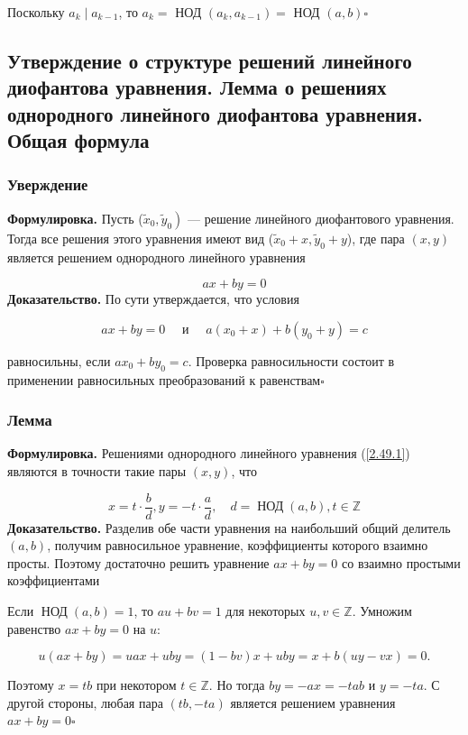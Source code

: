 \documentclass[a4paper]{article}
\newcommand{\qed}{\hfill$\square$}
\begin{document}
Поскольку $a_{k} \mid a_{k-1}$, то $a_{k}=$ НОД $\left(a_{k}, a_{k-1}\right)=$ НОД $(a, b)$\qed

\subsection{Утверждение о структуре решений линейного диофантова уравнения. Лемма о решениях однородного линейного диофантова уравнения. Общая формула}
\subsubsection*{Уверждение}
\textbf{Формулировка.} Пусть ($\left.\tilde{x}_{0}, \tilde{y}_{0}\right)$ — решение линейного диофантового уравнения. Тогда все решения этого уравнения имеют вид ($\tilde{x}_{0}+x, \tilde{y}_{0}+y$), где пара $(x, y)$ является решением однородного линейного уравнения

\begin{equation*}
a x+b y=0 \tag{2.49.1}\label{2.49.1}
\end{equation*}
\indent\textbf{Доказательство.} По сути утверждается, что условия

$$
a x+b y=0 \quad \text { и } \quad a\left(x_{0}+x\right)+b\left(y_{0}+y\right)=c
$$

равносильны, если $a x_{0}+b y_{0}=c$. Проверка равносильности состоит в применении равносильных преобразований к равенствам\qed

\subsubsection*{Лемма}
\textbf{Формулировка.}  Решениями однородного линейного уравнения (\ref{2.49.1}) являются в точности такие пары $(x, y)$, что

$$
x=t \cdot \frac{b}{d}, y=-t \cdot \frac{a}{d}, \quad d=\operatorname{НОД}(a, b), t \in \mathbb{Z}
$$
\indent\textbf{Доказательство.} Разделив обе части уравнения на наибольший общий делитель $(a, b)$, получим равносильное уравнение, коэффициенты которого взаимно просты. Поэтому достаточно решить уравнение $a x+b y=0$ со взаимно простыми коэффициентами

Если $\operatorname{НОД}(a, b)=1$, то $a u+b v=1$ для некоторых $u, v \in \mathbb{Z}$. Умножим равенство $a x+b y=0$ на $u:$

$$
u(a x+b y)=u a x+u b y=(1-b v) x+u b y=x+b(u y-v x)=0 .
$$

Поэтому $x=t b$ при некотором $t \in \mathbb{Z}$. Но тогда $b y=-a x=-t a b$ и $y=-t a$. С другой стороны, любая пара $(t b,-t a)$ является решением уравнения $a x+b y=0$\qed
\end{document}
